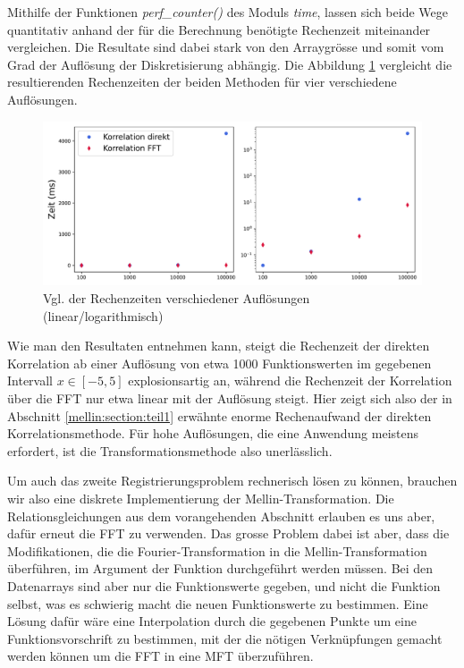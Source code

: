 Mithilfe der Funktionen {\em perf\_counter()} des Moduls {\em time}, lassen sich beide 
Wege quantitativ anhand der für die Berechnung benötigte Rechenzeit miteinander 
vergleichen.
Die Resultate sind dabei stark von den Arraygrösse und somit vom Grad der Auflösung 
der Diskretisierung abhängig.
Die Abbildung \ref{fig:mellin:zeiten} vergleicht die resultierenden Rechenzeiten 
der beiden Methoden für vier verschiedene Auflösungen.
\begin{figure}
    \centering
    \includegraphics[width=\textwidth]{papers/mellin/images/zeiten.pdf}
    \caption{Vgl. der Rechenzeiten verschiedener Auflösungen (linear/logarithmisch)}
    \label{fig:mellin:zeiten}
\end{figure}
Wie man den Resultaten entnehmen kann, steigt die Rechenzeit der direkten Korrelation
ab einer Auflösung von etwa 1000 Funktionswerten im gegebenen Intervall 
$x\in \left[-5,5\right]$ explosionsartig an, während die Rechenzeit der Korrelation 
über die FFT nur etwa linear mit der Auflösung steigt.
Hier zeigt sich also der in Abschnitt \ref{mellin:section:teil1} erwähnte enorme 
Rechenaufwand der direkten Korrelationsmethode.
Für hohe Auflösungen, die eine Anwendung meistens erfordert, ist die 
Transformationsmethode also unerlässlich.

Um auch das zweite Registrierungsproblem rechnerisch lösen zu können, brauchen wir also 
eine diskrete Implementierung der Mellin-Transformation.
Die Relationsgleichungen aus dem vorangehenden Abschnitt erlauben es uns aber, dafür 
erneut die FFT zu verwenden.
Das grosse Problem dabei ist aber, dass die Modifikationen, die die Fourier-Transformation
in die Mellin-Transformation überführen, im Argument der Funktion durchgeführt werden 
müssen.
Bei den Datenarrays sind aber nur die Funktionswerte gegeben, und nicht die Funktion 
selbst, was es schwierig macht die neuen Funktionswerte zu bestimmen.
Eine Lösung dafür wäre eine Interpolation durch die gegebenen Punkte um eine 
Funktionsvorschrift zu bestimmen, mit der die nötigen Verknüpfungen gemacht werden 
können um die FFT in eine MFT überzuführen.






